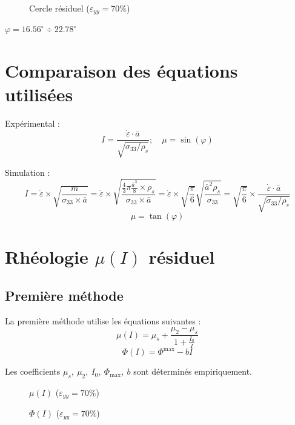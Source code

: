 \documentclass[a4paper,12pt]{report}
\begin{document}
                                \begin{figure}
                                    
                                    \caption{Cercle résiduel ($\varepsilon_{yy} = 70\%$)}
                                \end{figure}
                                    $\varphi = 16.56^\circ \div 22.78^\circ $
                                    
\section{Comparaison des équations utilisées}

Expérimental : 
\[
I =  \frac{\dot{\varepsilon} \cdot \bar{a}}{\sqrt{\sigma_{33}/\rho_s}}; \quad \mu = \sin(\varphi)
\]

Simulation : 
\[
I = \dot{\varepsilon} \times \sqrt {\frac{m}{\sigma_{33}\times \bar{a}}}  
= \dot{\varepsilon} \times \sqrt {\frac{\frac{4}{3} \pi \frac{\bar{a}^3}{8} \times \rho_s}{\sigma_{33}\times \bar{a}}} 
= \dot{\varepsilon} \times \sqrt{\frac{\pi}{6}} \sqrt {\frac{\bar{a}^2 \rho_s}{\sigma_{33}}} 
= \boxed{\sqrt{\frac{\pi}{6}}} \times \frac{\dot{\varepsilon} \cdot \bar{a}}{\sqrt{\sigma_{33}/\rho_s}}
\]
\[
\mu = \tan(\varphi)
\]

\section{Rhéologie $\mu(I)$ résiduel}

\subsection{Première méthode}

La première méthode utilise les équations suivantes :
\[
\mu(I) = \mu_s + \frac{\mu_2 - \mu_s}{1 + \frac{I_0}{I}}
\]
\[
\Phi(I) = \Phi^{\max} - bI
\]

Les coefficients $\mu_s,\ \mu_2,\ I_0,\ \Phi_{\max},\ b$ sont déterminés empiriquement.

\begin{figure}
    \centering
    {\small
        
    }
    \caption{$\mu(I)$ ($\varepsilon_{yy} = 70\%$)}
\end{figure}

\begin{figure}
    \centering
    {\small
        
    }
    \caption{$\Phi(I)$ ($\varepsilon_{yy} = 70\%$)}
\end{figure}
\end{document}
